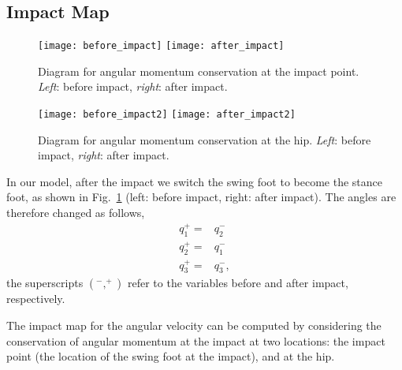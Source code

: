 \subsection{Impact Map}
\label{sec:impact}

\begin{figure}[h!]
\centering
\texttt{[image: before\_impact]}
\hspace{0.5cm}
\texttt{[image: after\_impact]}
\caption{Diagram for angular momentum conservation at the impact point. \emph{Left}: before impact, \emph{right}: after impact. }
\label{fig:impact}
\end{figure}


\begin{figure}[h!]
\centering
\texttt{[image: before\_impact2]}
\hspace{0.5cm}
\texttt{[image: after\_impact2]}
\caption{Diagram for angular momentum conservation at the hip. \emph{Left}: before impact, \emph{right}: after impact. }
\label{fig:impact2}
\end{figure}


In our model, after the impact we switch the swing foot to become the stance foot, as shown in Fig.~\ref{fig:impact} (left: before impact, right: after impact). The angles are therefore changed as follows,
\begin{align}
q_1^+ = & q_2^- \\
q_2^+ = & q_1^- \\
q_3^+ = & q_3^-,
\end{align}
the superscripts $(^-, ^+)$ refer to the variables before and after impact, respectively. 

The impact map for the angular velocity can be computed by considering the conservation of angular momentum at the impact at two locations: the impact point (the location of the swing foot at the impact), and at the hip. 

